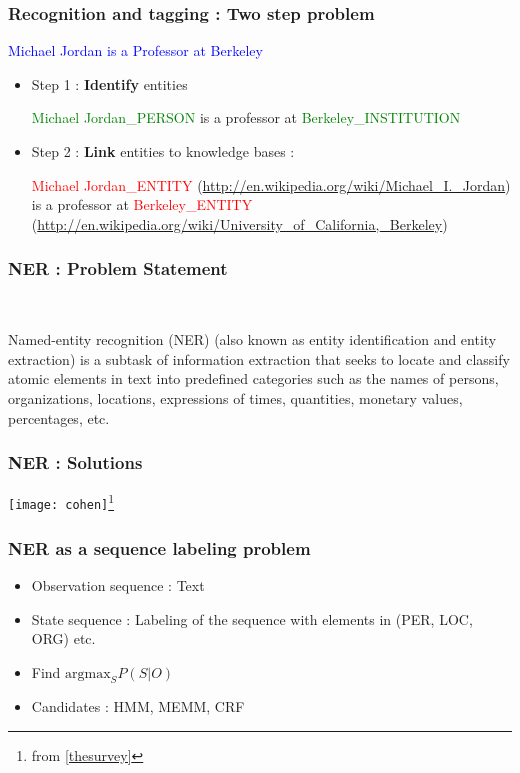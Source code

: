 \documentclass{beamer}
\begin{document}
\begin{frame}
 \frametitle{Recognition and tagging : Two step problem}
 \begin{center}
\textcolor{blue}{Michael Jordan is a Professor at Berkeley}
   \end{center}

 \begin{itemize}  
  \item Step 1 : \textbf{Identify} entities
  \medskip
  
  \textcolor{green}{Michael Jordan\_PERSON} is a professor at \textcolor{green}{Berkeley\_INSTITUTION} \medskip
  \item Step 2 : \textbf{Link} entities to knowledge bases : 
  \medskip
  
  \textcolor{red}{Michael Jordan\_ENTITY} (\url{http://en.wikipedia.org/wiki/Michael_I._Jordan})  is a professor at  
  \textcolor{red}{Berkeley\_ENTITY} (\url{http://en.wikipedia.org/wiki/University_of_California,_Berkeley})
\end{itemize}

\end{frame}

\begin{frame}
\frametitle{NER : Problem Statement}
 \begin{center}
\  \begin{definition}
   Named-entity recognition (NER) (also known as entity identification and entity extraction) is a subtask of information extraction that seeks to locate and classify 
   atomic elements in text into predefined categories such as the names of persons, organizations, locations, expressions of times, quantities, monetary values, percentages, etc.
  \end{definition}

 \end{center}
\end{frame}

\begin{frame}
 \frametitle{NER : Solutions}
 \begin{center}
 \texttt{[image: cohen]}\footnote{from \ref{thesurvey}}
 \end{center}

\end{frame}

 \begin{frame}
 \frametitle{NER as a sequence labeling problem}
 \begin{itemize}
  \item Observation sequence : Text \medskip
  \item State sequence : Labeling of the sequence with elements in (PER, LOC, ORG) etc. \medskip
  \item Find $\text{argmax}_{S}  P(S|O)$ \medskip
  \item Candidates : HMM, MEMM, CRF
  \end{itemize}
\end{frame}
\end{document}

